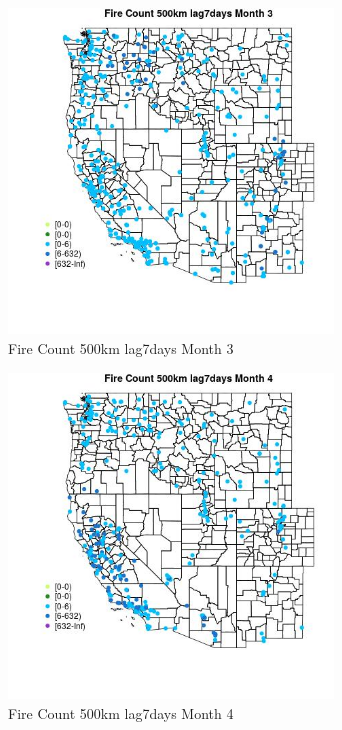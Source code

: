 \begin{figure} 
\centering  
\includegraphics[width=0.77\textwidth]{Code_Outputs/Report_ML_input_PM25_Step4_part_e_de_duplicated_aves_compiled_2019-05-18wNAs_MapObsMo3Fire_Count_500km_lag7days.jpg} 
\caption{\label{fig:Report_ML_input_PM25_Step4_part_e_de_duplicated_aves_compiled_2019-05-18wNAsMapObsMo3Fire_Count_500km_lag7days}Fire Count 500km lag7days Month 3} 
\end{figure} 
 

\clearpage 

\begin{figure} 
\centering  
\includegraphics[width=0.77\textwidth]{Code_Outputs/Report_ML_input_PM25_Step4_part_e_de_duplicated_aves_compiled_2019-05-18wNAs_MapObsMo4Fire_Count_500km_lag7days.jpg} 
\caption{\label{fig:Report_ML_input_PM25_Step4_part_e_de_duplicated_aves_compiled_2019-05-18wNAsMapObsMo4Fire_Count_500km_lag7days}Fire Count 500km lag7days Month 4} 
\end{figure} 
 

